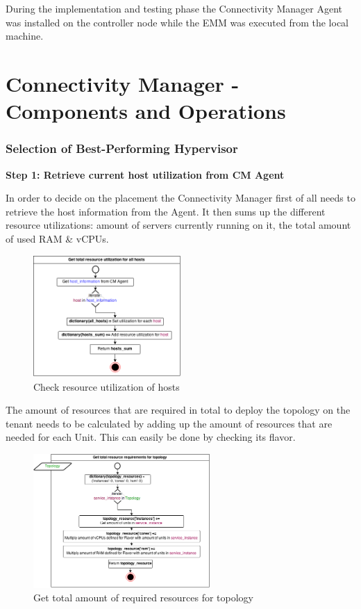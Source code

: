 During the implementation and testing phase the Connectivity Manager Agent was installed on the controller node while the EMM was executed from the local machine.

\section{Connectivity Manager - Components and Operations}

\subsubsection{Selection of Best-Performing Hypervisor}


\textbf{Step 1: Retrieve current host utilization from CM Agent}

In order to decide on the placement the Connectivity Manager first of all needs to retrieve the host information from the Agent. It then sums up the different resource utilizations: amount of servers currently running on it, the total amount of used RAM \& vCPUs.
\begin{figure}[H]
\centering

\includegraphics[width=0.5\textwidth]{images/design/cm_get_host_utilization}

\caption{Check resource utilization of hosts}
\end{figure}

The amount of resources that are required in total to deploy the topology on the tenant needs to be calculated by adding up the amount of resources that are needed for each Unit. This can easily be done by checking its flavor.

\begin{figure}[H]
\centering

\includegraphics[width=0.6\textwidth]{images/design/cm_get_topology_requirements}

\caption{Get total amount of required resources for topology}
\end{figure}

